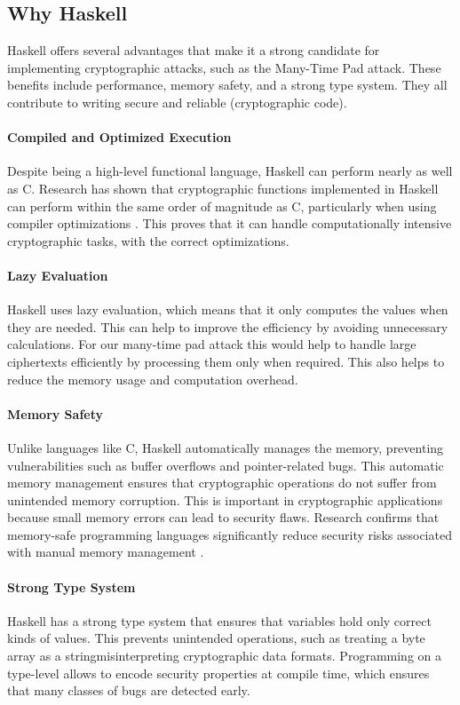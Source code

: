 \subsection{Why Haskell}
\label{sec:why_haskell}
Haskell offers several advantages that make it a strong candidate for implementing cryptographic attacks, 
such as the Many-Time Pad attack. These benefits include performance, memory safety, and a strong type system. 
They all contribute to writing secure and reliable (cryptographic code). 

\paragraph{Compiled and Optimized Execution} 
Despite being a high-level functional language, Haskell can perform nearly as well as C. 
Research has shown that cryptographic functions implemented in Haskell can perform within the same order of magnitude as C, 
particularly when using compiler optimizations \cite{Ankner2013}. 
This proves that it can handle computationally intensive cryptographic tasks, with the correct optimizations.

\paragraph{Lazy Evaluation} 
Haskell uses lazy evaluation, which means that it only computes the values when they are needed. 
This can help to improve the efficiency by avoiding unnecessary calculations. 
For our many-time pad attack this would help to handle large ciphertexts efficiently by processing them only when required. 
This also helps to reduce the memory usage and computation overhead.

\paragraph{Memory Safety}
Unlike languages like C, Haskell automatically manages the memory, preventing vulnerabilities such as buffer overflows and pointer-related bugs. 
This automatic memory management ensures that cryptographic operations do not suffer from unintended memory corruption. 
This is important in cryptographic applications because small memory errors can lead to security flaws. 
Research confirms that memory-safe programming languages significantly reduce security risks associated with manual memory management \cite{Dwivedi2021}. 

\paragraph{Strong Type System}
Haskell has a strong type system that ensures that variables hold only correct kinds of values. 
This prevents unintended operations, such as treating a byte array as a stringmisinterpreting cryptographic data formats. 
Programming on a type-level allows to encode security properties at compile time, which ensures that many classes of bugs are detected early.

